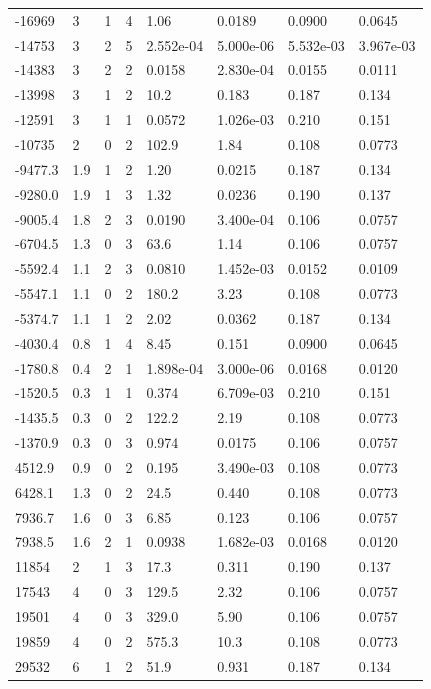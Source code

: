 \documentclass[preview]{standalone}
\begin{document}
{{\begin{tabular}{L{1.2cm}C{1.2cm} C{0.3cm}C{0.5cm} C{1.4cm}C{1.4cm} C{1.4cm}C{1.4cm}}
  -16969  &     3  & 1     &  4 &  1.06  & 0.0189  & 0.0900 &  0.0645   \\ 
  -14753  &     3  & 2     &  5 &  2.552e-04  & 5.000e-06  & 5.532e-03 &  3.967e-03   \\ 
  -14383  &     3  & 2     &  2 &  0.0158  & 2.830e-04  & 0.0155 &  0.0111   \\ 
  -13998  &     3  & 1     &  2 &  10.2  & 0.183  & 0.187 &  0.134   \\ 
  -12591  &     3  & 1     &  1 &  0.0572  & 1.026e-03  & 0.210 &  0.151   \\ 
  -10735  &     2  & 0     &  2 &  102.9  & 1.84  & 0.108 &  0.0773   \\ 
  -9477.3  &   1.9  & 1     &  2 &  1.20  & 0.0215  & 0.187 &  0.134   \\ 
  -9280.0  &   1.9  & 1     &  3 &  1.32  & 0.0236  & 0.190 &  0.137   \\ 
  -9005.4  &   1.8  & 2     &  3 &  0.0190  & 3.400e-04  & 0.106 &  0.0757   \\ 
  -6704.5  &   1.3  & 0     &  3 &  63.6  & 1.14  & 0.106 &  0.0757   \\ 
  -5592.4  &   1.1  & 2     &  3 &  0.0810  & 1.452e-03  & 0.0152 &  0.0109   \\ 
  -5547.1  &   1.1  & 0     &  2 &  180.2  & 3.23  & 0.108 &  0.0773   \\ 
  -5374.7  &   1.1  & 1     &  2 &  2.02  & 0.0362  & 0.187 &  0.134   \\ 
  -4030.4  &   0.8  & 1     &  4 &  8.45  & 0.151  & 0.0900 &  0.0645   \\ 
  -1780.8  &   0.4  & 2     &  1 &  1.898e-04  & 3.000e-06  & 0.0168 &  0.0120   \\ 
  -1520.5  &   0.3  & 1     &  1 &  0.374  & 6.709e-03  & 0.210 &  0.151   \\ 
  -1435.5  &   0.3  & 0     &  2 &  122.2  & 2.19  & 0.108 &  0.0773   \\ 
  -1370.9  &   0.3  & 0     &  3 &  0.974  & 0.0175  & 0.106 &  0.0757   \\ 
  4512.9  &   0.9  & 0     &  2 &  0.195  & 3.490e-03  & 0.108 &  0.0773   \\ 
  6428.1  &   1.3  & 0     &  2 &  24.5  & 0.440  & 0.108 &  0.0773   \\ 
  7936.7  &   1.6  & 0     &  3 &  6.85  & 0.123  & 0.106 &  0.0757   \\ 
  7938.5  &   1.6  & 2     &  1 &  0.0938  & 1.682e-03  & 0.0168 &  0.0120   \\ 
  11854  &     2  & 1     &  3 &  17.3  & 0.311  & 0.190 &  0.137   \\ 
  17543  &     4  & 0     &  3 &  129.5  & 2.32  & 0.106 &  0.0757   \\ 
  19501  &     4  & 0     &  3 &  329.0  & 5.90  & 0.106 &  0.0757   \\ 
  19859  &     4  & 0     &  2 &  575.3  & 10.3  & 0.108 &  0.0773   \\ 
  29532  &     6  & 1     &  2 &  51.9  & 0.931  & 0.187 &  0.134   \\ 
\hline 
\end{tabular} 

}}
\end{document}
